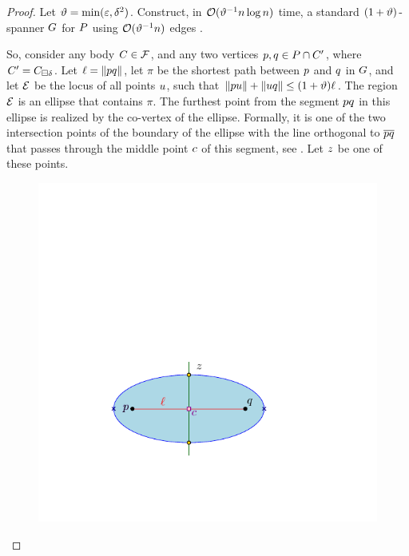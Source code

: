 \documentclass[12pt]{article}%
\begin{document}
\begin{proof}
    Let $\vartheta = \min( \varepsilon, \delta^2)$. Construct, in
    $\mathcal{O}(\vartheta^{-1} n \log n)$ time, a standard $(1+\vartheta)$-spanner
    $G$ for $P$ using $\mathcal{O}( \vartheta^{-1} n)$ edges
    \cite{ams-dagss-99}.

    So, consider any body $C \in \mathcal{F}$, and any two vertices
    $p, q \in P \cap C'$, where
    $C'=C_{\boxminus \delta}$. Let $\ell = \left\| p q \right\|$, let
    $\pi$ be the shortest path between $p$ and $q$ in $G$, and
    let $\mathcal{E}$ be the locus of all points $u$, such that
    $\left\| p u \right\| + \left\| u q \right\| \leq (1+\vartheta) \ell$. The region
    $\mathcal{E}$ is an ellipse that contains $\pi$. The furthest point from
    the segment $pq$ in this ellipse is realized by the co-vertex
    of the ellipse. Formally, it is one of the two intersection points
    of the boundary of the ellipse with the line orthogonal to
    $\overline{p q}$ that passes through the middle point $c$
    of this segment, see . Let $z$ be one of these
    points.

    \begin{figure}[h]
        \centerline{\includegraphics{figs/ellipse}}
        \caption{}
    \end{figure}


\end{proof}
\end{document}
